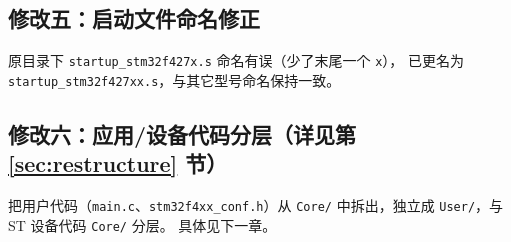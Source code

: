 \subsection{修改五：启动文件命名修正}

原目录下 \texttt{startup\_stm32f427x.s} 命名有误（少了末尾一个 \texttt{x}），
已更名为 \texttt{startup\_stm32f427xx.s}，与其它型号命名保持一致。

\subsection{修改六：应用/设备代码分层（详见第 \ref{sec:restructure} 节）}

把用户代码（\texttt{main.c}、\texttt{stm32f4xx\_conf.h}）从 \texttt{Core/}
中拆出，独立成 \texttt{User/}，与 ST 设备代码 \texttt{Core/} 分层。
具体见下一章。
